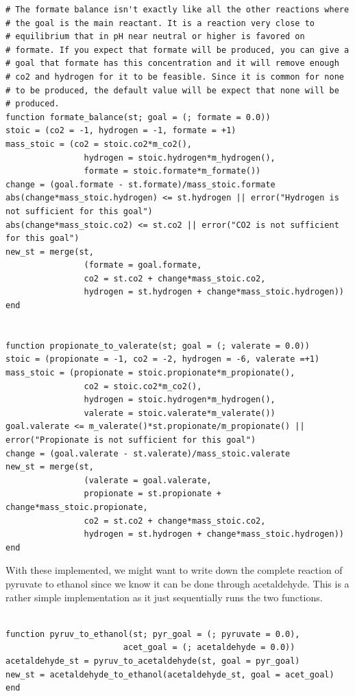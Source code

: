\documentclass[11pt]{article}
\begin{document}
\begin{verbatim}
# The formate balance isn't exactly like all the other reactions where
# the goal is the main reactant. It is a reaction very close to
# equilibrium that in pH near neutral or higher is favored on
# formate. If you expect that formate will be produced, you can give a
# goal that formate has this concentration and it will remove enough
# co2 and hydrogen for it to be feasible. Since it is common for none
# to be produced, the default value will be expect that none will be
# produced.
function formate_balance(st; goal = (; formate = 0.0))
stoic = (co2 = -1, hydrogen = -1, formate = +1)
mass_stoic = (co2 = stoic.co2*m_co2(),
                hydrogen = stoic.hydrogen*m_hydrogen(),
                formate = stoic.formate*m_formate())
change = (goal.formate - st.formate)/mass_stoic.formate
abs(change*mass_stoic.hydrogen) <= st.hydrogen || error("Hydrogen is not sufficient for this goal")
abs(change*mass_stoic.co2) <= st.co2 || error("CO2 is not sufficient for this goal")
new_st = merge(st,
                (formate = goal.formate,
                co2 = st.co2 + change*mass_stoic.co2,
                hydrogen = st.hydrogen + change*mass_stoic.hydrogen))
end


function propionate_to_valerate(st; goal = (; valerate = 0.0))
stoic = (propionate = -1, co2 = -2, hydrogen = -6, valerate =+1)
mass_stoic = (propionate = stoic.propionate*m_propionate(),
                co2 = stoic.co2*m_co2(),
                hydrogen = stoic.hydrogen*m_hydrogen(),
                valerate = stoic.valerate*m_valerate())
goal.valerate <= m_valerate()*st.propionate/m_propionate() || error("Propionate is not sufficient for this goal")
change = (goal.valerate - st.valerate)/mass_stoic.valerate
new_st = merge(st,
                (valerate = goal.valerate,
                propionate = st.propionate + change*mass_stoic.propionate,
                co2 = st.co2 + change*mass_stoic.co2,
                hydrogen = st.hydrogen + change*mass_stoic.hydrogen))
end

\end{verbatim}

With these implemented, we might want to write down the complete reaction of pyruvate to ethanol since we know it can be done through acetaldehyde. This is a rather simple implementation as it just sequentially runs the two functions.

\begin{verbatim}

function pyruv_to_ethanol(st; pyr_goal = (; pyruvate = 0.0),
                        acet_goal = (; acetaldehyde = 0.0))
acetaldehyde_st = pyruv_to_acetaldehyde(st, goal = pyr_goal)
new_st = acetaldehyde_to_ethanol(acetaldehyde_st, goal = acet_goal)
end

\end{verbatim}
\end{document}
